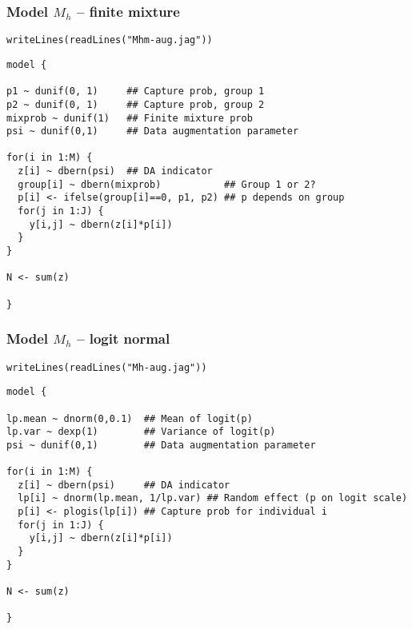 \documentclass[color=usenames,dvipsnames]{beamer}\usepackage[]{graphicx}\usepackage[]{color}
\makeatletter
\newcommand{\hlstr}[1]{\textcolor[rgb]{0.749,0.012,0.012}{#1}}%
\newcommand{\hlstd}[1]{\textcolor[rgb]{0,0,0}{#1}}%
\newcommand{\hlkwd}[1]{\textcolor[rgb]{0.004,0.004,0.506}{#1}}%
\newenvironment{kframe}{%
 \def\at@end@of@kframe{}%
 \ifinner\ifhmode%
  \def\at@end@of@kframe{\end{minipage}}%
  \begin{minipage}{\columnwidth}%
 \fi\fi%
 \def\FrameCommand##1{\hskip\@totalleftmargin \hskip-\fboxsep
 \colorbox{shadecolor}{##1}\hskip-\fboxsep
     \hskip-\linewidth \hskip-\@totalleftmargin \hskip\columnwidth}%
 \MakeFramed {\advance\hsize-\width
   \@totalleftmargin\z@ \linewidth\hsize
   \@setminipage}}%
 {\par\unskip\endMakeFramed%
 \at@end@of@kframe}
\newenvironment{knitrout}{}{} %
\makeatother
\begin{document}
\begin{frame}[fragile]
  \frametitle{Model $M_h$ -- finite mixture}
\vspace{-3pt}
\begin{knitrout}\footnotesize
{}\color{fgcolor}\begin{kframe}
\begin{alltt}
\hlkwd{writeLines}\hlstd{(}\hlkwd{readLines}\hlstd{(}\hlstr{"Mhm-aug.jag"}\hlstd{))}
\end{alltt}
\begin{verbatim}
model {

p1 ~ dunif(0, 1)     ## Capture prob, group 1
p2 ~ dunif(0, 1)     ## Capture prob, group 2
mixprob ~ dunif(1)   ## Finite mixture prob
psi ~ dunif(0,1)     ## Data augmentation parameter

for(i in 1:M) {     
  z[i] ~ dbern(psi)  ## DA indicator
  group[i] ~ dbern(mixprob)           ## Group 1 or 2?
  p[i] <- ifelse(group[i]==0, p1, p2) ## p depends on group
  for(j in 1:J) {
    y[i,j] ~ dbern(z[i]*p[i])
  }
}

N <- sum(z)

}
\end{verbatim}
\end{kframe}
\end{knitrout}
\end{frame}



\begin{frame}[fragile]
  \frametitle{Model $M_h$ -- logit normal}
\vspace{-3pt}
\begin{knitrout}\footnotesize
{}\color{fgcolor}\begin{kframe}
\begin{alltt}
\hlkwd{writeLines}\hlstd{(}\hlkwd{readLines}\hlstd{(}\hlstr{"Mh-aug.jag"}\hlstd{))}
\end{alltt}
\begin{verbatim}
model {

lp.mean ~ dnorm(0,0.1)  ## Mean of logit(p)
lp.var ~ dexp(1)        ## Variance of logit(p)
psi ~ dunif(0,1)        ## Data augmentation parameter

for(i in 1:M) {     
  z[i] ~ dbern(psi)     ## DA indicator
  lp[i] ~ dnorm(lp.mean, 1/lp.var) ## Random effect (p on logit scale)
  p[i] <- plogis(lp[i]) ## Capture prob for individual i
  for(j in 1:J) {
    y[i,j] ~ dbern(z[i]*p[i])
  }
}

N <- sum(z)

}
\end{verbatim}
\end{kframe}
\end{knitrout}
\end{frame}
\end{document}
